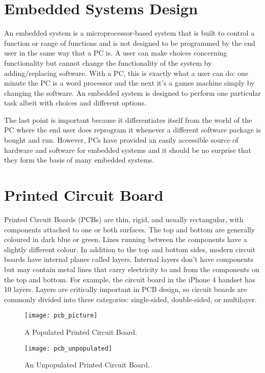 \section{Embedded Systems Design} 


An embedded system is a microprocessor-based system
that is built to control a function or range of functions and is not designed to be
programmed by the end user in the same way that a PC is. A user can make choices
concerning functionality but cannot change the functionality of the system by
adding/replacing software. With a PC, this is exactly what a user can do: one minute
the PC is a word processor and the next it's a games machine simply by changing the
software. An embedded system is designed to perform one particular task albeit with
choices and different options.

The last point is important because it differentiates itself from the world of the PC
where the end user does reprogram it whenever a different software package is bought
and run. However, PCs have provided an easily accessible source of hardware and
software for embedded systems and it should be no surprise that they form the basis
of many embedded systems.

\section{Printed Circuit Board} 

Printed Circuit Boards (PCBs) are thin, rigid, and usually rectangular, with
components attached to one or both surfaces. The top and bottom are generally
coloured in dark blue or green. Lines running between the components have a slightly
different colour. In addition to the top and bottom sides, modern circuit boards have
internal planes called layers. Internal layers don’t have components but may contain
metal lines that carry electricity to and from the components on the top and bottom.
For example, the circuit board in the iPhone 4 handset has 10 layers. Layers are
critically important in PCB design, so circuit boards are commonly divided into three
categories: single-sided, double-sided, or multilayer. 

\begin{figure}[p]
\texttt{[image: pcb\_picture]}
\centering
\caption{A Populated Printed Circuit Board.}
\centering
\label{fig:pcb_pop}


\end{figure}

\begin{figure}[p]

\texttt{[image: pcb\_unpopulated]}
\centering
\caption{An Unpopulated Printed Circuit Board.}
\centering
\label{fig:pcb_unpop}


\end{figure}

